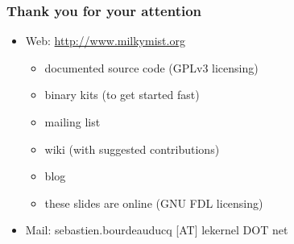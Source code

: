 \documentclass{beamer}
\begin{document}
\frame
{
  \frametitle{Thank you for your attention}
  \begin{itemize}
  \item Web: \url{http://www.milkymist.org}
  \begin{itemize}
  \item documented source code (GPLv3 licensing)
  \item binary kits (to get started fast)
  \item mailing list
  \item wiki (with suggested contributions)
  \item blog
  \item these slides are online (GNU FDL licensing)
  \end{itemize}
  \item Mail: sebastien.bourdeauducq [AT] lekernel DOT net
  \end{itemize}

  \begin{center}
  \end{center}
}
\end{document}
